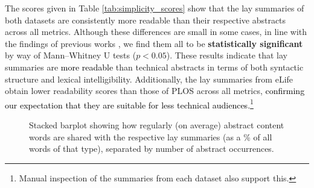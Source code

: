 \documentclass[11pt]{article}
\begin{document}
The scores given in Table \ref{tab:simplicity_scores} show that the lay summaries of both datasets are consistently more readable than their respective abstracts across all metrics. Although these differences are small in some cases, in line with the findings of previous works \citep{Devaraj2021-ha}, we find them all to be \textbf{statistically significant} by way of Mann–Whitney U tests ($p<0.05$). 
These results indicate that lay summaries are \textcolor{black}{more readable} than technical abstracts in terms of both syntactic structure and lexical intelligibility.
Additionally, the lay summaries from eLife obtain lower readability scores than those of PLOS across all metrics, \textcolor{black}{confirming our expectation that they are suitable for less technical audiences.}\footnote{Manual inspection of the summaries from each dataset also support this.} 


\begin{table}[t]
    \centering
    \caption{Mean percentage of each rhetorical label within our abstracts and lay summaries.}
    \label{tab:discourse_percs}
\end{table}



\begin{figure*}[ht]
    \centering
    \caption{Stacked barplot showing how regularly (on average) abstract content words are shared with the respective lay summaries (as a \% of all words of that type), separated by number of abstract occurrences.}
    \label{fig:content_word_sharing}
\end{figure*}
\end{document}
